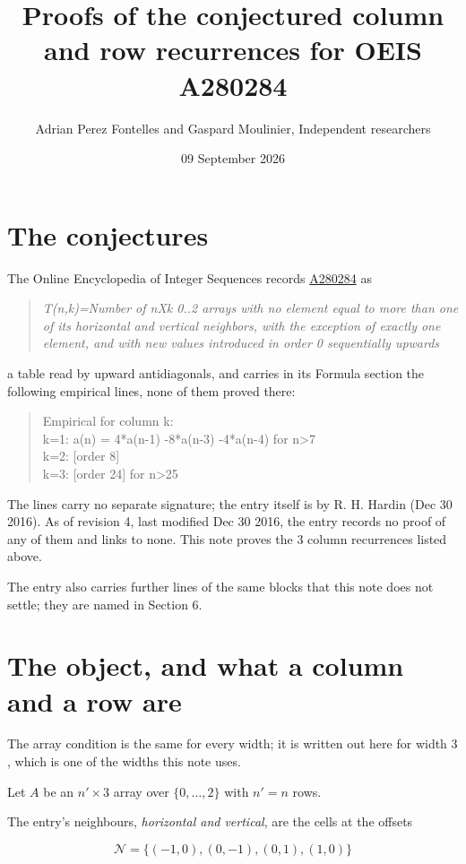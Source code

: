 \documentclass[11pt]{article}
\title{Proofs of the conjectured column and row recurrences for OEIS A280284}
\author{Adrian Perez Fontelles and Gaspard Moulinier, Independent researchers}
\date{09 September 2026}
\theoremstyle{definition}
\begin{document}
\maketitle
\section{The conjectures}

The Online Encyclopedia of Integer Sequences records \href{https://oeis.org/A280284}{A280284} as

\begin{quote}\itshape T(n,k)=Number of nXk 0..2 arrays with no element equal to more than one of its horizontal and vertical neighbors, with the exception of exactly one element, and with new values introduced in order 0 sequentially upwards\end{quote}

a table read by upward antidiagonals, and carries in its Formula section the following empirical lines, none of them proved there:

\begin{quote}\ttfamily Empirical for column k:\\
k=1: a(n) = 4*a(n-1) -8*a(n-3) -4*a(n-4) for n>7\\k=2: [order 8]\\k=3: [order 24] for n>25\end{quote}

The lines carry no separate signature; the entry itself is by R. H. Hardin (Dec 30 2016). As of revision 4, last modified Dec 30 2016, the entry records no proof of any of them and links to none. This note proves the 3 column recurrences listed above.

The entry also carries further lines of the same blocks that this note does not settle; they are named in Section 6.

\section{The object, and what a column and a row are}

The array condition is the same for every width; it is written out here for width $3$, which is one of the widths this note uses.

Let $A$ be an $n' \times 3$ array over $\{0,\dots,2\}$ with $n' = n$ rows.

The entry's neighbours, {\itshape horizontal and vertical}, are the cells at the offsets

\[\mathcal{N} = \{(-1,0), (0,-1), (0,1), (1,0)\}\]
\end{document}
